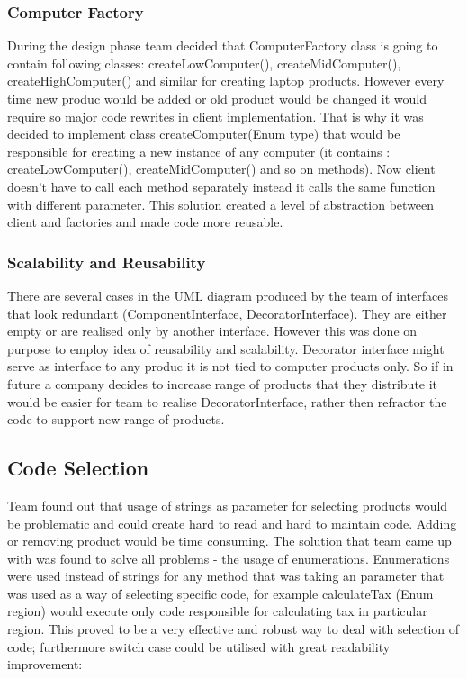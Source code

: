 \documentclass[pdftex,11pt,a4paper]{article}
\begin{document}
\subsubsection{Computer Factory}
During the design phase team decided that ComputerFactory class is going to contain following classes: createLowComputer(), createMidComputer(), createHighComputer() and similar for creating laptop products. However every time new produc would be added or old product would be changed it would require so major code rewrites in client implementation. That is why it was decided to implement class createComputer(Enum type) that would be responsible for creating a new instance of any computer (it contains : createLowComputer(), createMidComputer() and so on methods). Now client doesn't have to call each method separately instead it calls the same function with different parameter. This solution created a level of abstraction between client and factories and made code more reusable.

\subsubsection{Scalability and Reusability}
There are several cases in the UML diagram produced by the team of interfaces that look redundant (ComponentInterface, DecoratorInterface). They are either empty or are realised only by another interface. However this was done on purpose to employ idea of reusability and scalability. Decorator interface might serve as interface to any produc it is not tied to computer products only. So if in future a company decides to increase range of products that they distribute it would be easier for team to realise DecoratorInterface, rather then refractor the code to support new range of products. 

\subsection{Code Selection}
Team found out that usage of strings as parameter for selecting products would be problematic and could create hard to read and hard to maintain code. Adding or removing product would be time consuming. The solution that team came up with was found to solve all problems - the usage of enumerations. Enumerations were used instead of strings for any method that was taking an parameter that was used as a way of selecting specific code, for example calculateTax (Enum region) would execute only code responsible for calculating tax in particular region. This proved to be a very effective and robust way to deal with selection of code; furthermore switch case could be utilised with great readability improvement:
\end{document}
